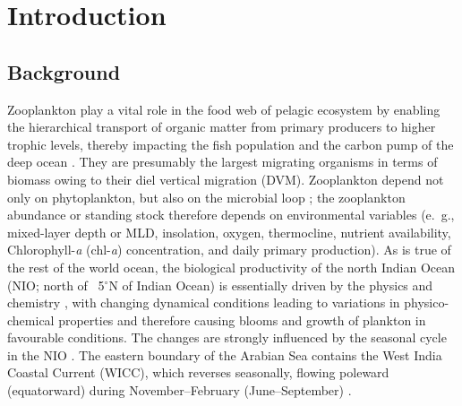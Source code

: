 \documentclass[authoryear,review,11pt]{elsarticle}
\newcommand{\chla}{chl-{\emph{a}}}
\begin{document}
\pagebreak


\linenumbers

\section{Introduction}
\label{sec:intro}

\subsection{Background}
\label{sec:intro.back}

Zooplankton play a vital role in the food web of pelagic ecosystem by enabling the hierarchical transport of organic matter from primary producers to higher trophic levels, thereby impacting the fish population \citep{ohman2001density} and the carbon pump of the deep ocean \citep{le2016global}. They are presumably the largest migrating organisms in terms of biomass \citep{hays2003review} owing to their diel vertical migration (DVM). Zooplankton depend not only on phytoplankton, but also on the microbial loop \citep{azam1983microbial}; the zooplankton abundance or standing stock therefore depends on environmental variables (e.~g., mixed-layer depth or MLD, insolation, oxygen, thermocline, nutrient availability, Chlorophyll-\emph{a} (\chla) concentration, and daily primary production). As is true of the rest of the world ocean, the biological productivity of the north Indian Ocean (NIO; north of ~5$^{\circ}$N of Indian Ocean) is essentially driven by the physics and chemistry \citep[see, for example,][]{subrahmanyan1959studiespart2, banse1968hydrography, banse1995zooplankton, ryther1966primary, nair1970primary, qasim1977biological, levy2007basin, mccreary2009biophysical, vijith2016consequences, shankar2016inhibition, shankar2019role, amol2020modulation}, with changing dynamical conditions leading to variations in physico-chemical properties and therefore causing blooms and growth of plankton in favourable conditions. The changes are strongly influenced by the seasonal cycle in the NIO \citep{banse1968hydrography, mccreary1996four, mccreary2009biophysical, levy2007basin, shankar2019role, aparna2022seasonal}. The eastern boundary of the Arabian Sea contains the West India Coastal Current (WICC), which reverses seasonally, flowing poleward (equatorward) during November--February (June--September) \citep{banse1968hydrography, shetye1990hydrography, shetye19911517, vijith2022circulation, mccreary1993numerical, shankar1997dynamics, shankar2002monsoon}. 
\end{document}
